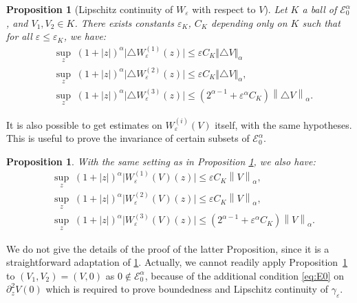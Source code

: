 \documentclass[10pt]{amsart}
\let\mathcal\mathscr
\theoremstyle{plain}
\newtheorem{prop}[thm]{Proposition}
\theoremstyle{definition}
\let\eps\varepsilon
\let\ds\displaystyle
\newcommand{\norm}[1]{\left\lVert#1\right\rVert}
\newcommand{\nalph}[1]{\left\lVert#1\right\rVert_\alpha}
\newcommand{\Eaz}{\mathcal{E}^\alpha_0}
\begin{document}
\begin{prop}[Lipschitz continuity of $W_\eps$ with respect to $V$]\label{unif boundsDeltaW}
Let $K$ a ball of $\Eaz$, and $V_1, V_2 \in K $. There exists constants $\eps_K$, $C_K$ depending only on $K$ such that for all $\eps \leq \eps_K$, we have:
\begin{align}
& \label{estim Delta 1} \ds \sup_z\; (1+|z|)^\alpha \vert\triangle W_\eps^{(1)}	(z) \vert \leq \eps C_K \Vert \triangle V \Vert_\alpha\\
& \label{estim Delta 2} \ds \sup_z\; (1+|z|)^\alpha \vert\triangle W_\eps^{(2)}(z) \vert \leq \eps C_K \Vert \triangle V \Vert_\alpha, \\
& \label{estim Delta 3} \ds \sup_z \; (1+|z|)^\alpha \vert\triangle W_\eps^{(3)}(z)\vert \leq \left(2^{\alpha-1} + \eps^\alpha C_K \right)\norm{\triangle V}_\alpha.
\end{align}
\end{prop}

It is also possible to get estimates on $W_\eps^{(i)}(V)$ itself, with the same hypotheses. This is useful to prove the invariance of certain subsets of $\Eaz$.
\begin{prop}\label{unif boundsW}
With the same setting as in Proposition \ref{unif boundsDeltaW}, we also have:
\begin{align*}
& \ds \sup_z \; (1+|z|)^\alpha \vert W^{(1)}_\eps(V)(z)\vert \leq \eps C_K \nalph{V},\\
& \ds \sup_z \; (1+|z|)^\alpha \vert W^{(2)}_\eps(V)(z)\vert \leq \eps C_K \nalph{V},\\
& \ds \sup_z \; (1+|z|)^\alpha \vert W_\eps^{(3)}(V)(z) \vert \leq \left(2^{\alpha-1} + \eps^\alpha C_K \right) \nalph{V}.
\end{align*}
\end{prop}

We do not give the details of the proof of the latter Proposition, since it is a straightforward adaptation of \cref{unif boundsDeltaW}. Actually, we cannot readily apply Proposition~\ref{unif boundsDeltaW} to $(V_1,V_2) = (V,0)$ as $0\notin \Eaz$, because of the additional condition \eqref{eq:E0} on $\partial_z^2V(0)$ which is required to prove boundedness and Lipschitz continuity of $\gamma_\eps$.
\end{document}
